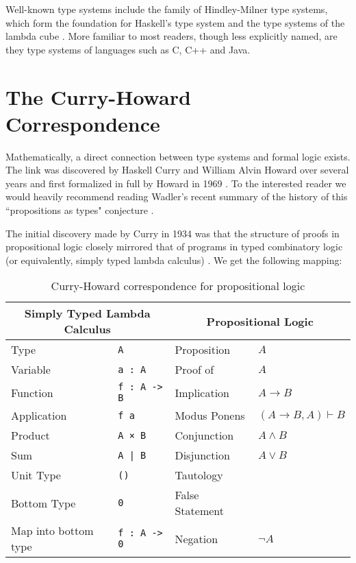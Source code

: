 Well-known type systems include the family of Hindley-Milner type systems, which form the foundation for Haskell's type system \cite{haskelldesignreport} and the type systems of the lambda cube \cite{barendregt:1991:lambdacube}. More familiar to most readers, though less explicitly named, are they type systems of languages such as C, C++ and Java.

\section{The Curry-Howard Correspondence}
Mathematically, a direct connection between type systems and formal logic exists. The link was discovered by Haskell Curry and William Alvin Howard over several years and first formalized in full by Howard in 1969 \cite{howard1969formulaeastypes}. To the interested reader we would heavily recommend reading Wadler's recent summary of the history of this ``propositions as types" conjecture \cite{wadler:2015:propositions}.

The initial discovery made by Curry in 1934 was that the structure of proofs in propositional logic closely mirrored that of programs in typed combinatory logic (or equivalently, simply typed lambda calculus) \cite{curry1934functionality}. We get the following mapping:

\begin{table}[H]
    \begin{center}
    \begin{tabular}{ll|ll}
                    \multicolumn{2}{c|}{\textbf{Simply Typed Lambda Calculus}}  & \multicolumn{2}{c}{\textbf{Propositional Logic}} \\ \hline
        Type        & \texttt{A}            & Proposition   & $A$ \\
        Variable    & \texttt{a : A}        & Proof of      & $A$ \\
        Function    & \texttt{f : A -> B}   & Implication   & $A \to B$ \\
        Application & \texttt{f a}          & Modus Ponens  & $(A \to B, A) \vdash B$ \\
        Product     & \texttt{A × B}        & Conjunction   & $A \land B$ \\
        Sum         & \texttt{A | B}        & Disjunction   & $A \lor B$ \\
        Unit Type   & \texttt{()}           & Tautology     & \\
        Bottom Type & \texttt{0}            & False Statement & \\
        Map into bottom type & \texttt{f : A -> 0}   & Negation       & $\lnot A$
    \end{tabular}
    \end{center}
\caption{Curry-Howard correspondence for propositional logic}
\label{tab:curryhowardprop}
\end{table}

